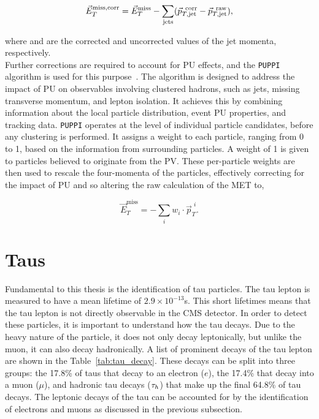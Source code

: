 \begin{equation}
\vec{E}_{T}^{\text{miss,corr}} = \vec{E}_{T}^{\text{miss}} - \sum_{\text{jets}} (\vec{p}_{T,\text{jet}}^{\text{\hspace{4pt}corr}} - \vec{p}_{T,\text{jet}}^{\text{\hspace{4pt}raw}}),
\end{equation}

where  and  are the corrected and uncorrected values of the jet momenta, respectively. \\

Further corrections are required to account for \ac{PU} effects, and the \texttt{PUPPI} algorithm is used for this purpose~\cite{CMS:2020ebo}.
The algorithm is designed to address the impact of \ac{PU} on observables involving clustered hadrons, such as jets, missing transverse momentum, and lepton isolation. 
It achieves this by combining information about the local particle distribution, event \ac{PU} properties, and tracking data. 
\texttt{PUPPI} operates at the level of individual particle candidates, before any clustering is performed. 
It assigns a weight to each particle, ranging from 0 to 1, based on the information from surrounding particles. 
A weight of 1 is given to particles believed to originate from the \ac{PV}. 
These per-particle weights are then used to rescale the four-momenta of the particles, effectively correcting for the impact of \ac{PU} and so altering the raw calculation of the \ac{MET} to,

\begin{equation}
\vec{E}_{T}^{\text{miss}} = - \sum_{i} w_{i} \cdot \vec{p}_{T}^{\hspace{4pt}i}.
\end{equation}

\section{Taus}

Fundamental to this thesis is the identification of tau particles.
The tau lepton is measured to have a mean lifetime of \(2.9 \times 10^{-13}\)s. 
This short lifetimes means that the tau lepton is not directly observable in the \ac{CMS} detector.  
In order to detect these particles, it is important to understand how the tau decays. 
Due to the heavy nature of the particle, it does not only decay leptonically, but unlike the muon, it can also decay hadronically.
A list of prominent decays of the tau lepton are shown in the Table~\ref{tab:tau_decay}.
These decays can be split into three groups: the 17.8\% of taus that decay to an electron ($e$), the 17.4\% that decay into a muon ($\mu$), and hadronic tau decays ($\tau_{h}$) that make up the final 64.8\% of tau decays. 
The leptonic decays of the tau can be accounted for by the identification of electrons and muons as discussed in the previous subsection.  \\

